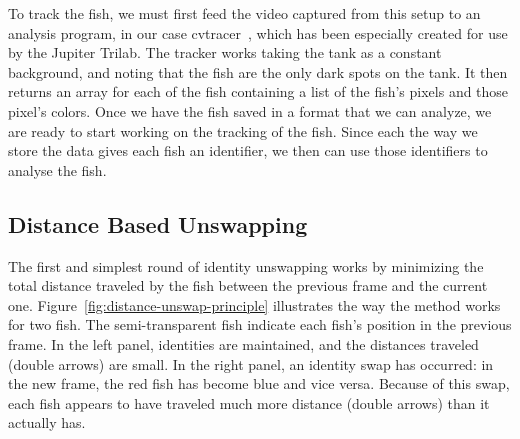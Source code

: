 \documentclass{article}
\begin{document}
To track the fish, we must first feed the video captured from this setup to an analysis program, in our case cvtracer~\cite{patch_kinematic_2020, patch_patchmemorycvtracer_2020}, which has been especially created for use by the Jupiter Trilab. 
The tracker works taking the tank as a constant background, and noting that the fish are the only dark spots on the tank. It then returns an array for each of the fish containing a list of the fish's pixels and those pixel's colors. Once we have the fish saved in a format that we can analyze, we are ready to start working on the tracking of the fish. Since each the way we store the data gives each fish an identifier, we then can use those identifiers to analyse the fish.

%


\subsection{Distance Based Unswapping}
\label{sec:Distance Based Unswapping}

The first and simplest round of identity unswapping works by minimizing the total distance traveled by the fish between the previous frame and the current one. Figure~\ref{fig:distance-unswap-principle} illustrates the way the method works for two fish. The semi-transparent fish indicate each fish's position in the previous frame. In the left panel, identities are maintained, and the distances traveled (double arrows) are small. In the right panel, an identity swap has occurred: in the new frame, the red fish has become blue and vice versa. Because of this swap, each fish appears to have traveled much more distance (double arrows) than it actually has.
\end{document}
